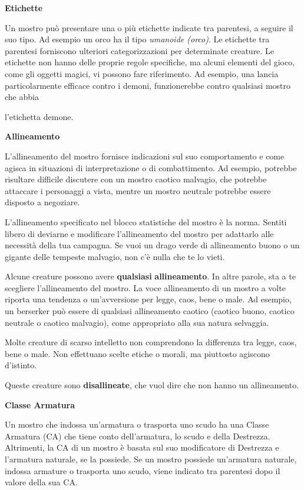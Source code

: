\begin{multicols}{2}
\textbf{Etichette}

Un mostro può presentare una o più etichette indicate tra parentesi, a
seguire il suo tipo. Ad esempio un orco ha il tipo \emph{umanoide
(orco)}. Le etichette tra parentesi forniscono ulteriori
categorizzazioni per determinate creature. Le etichette non hanno delle
proprie regole specifiche, ma alcuni elementi del gioco, come gli
oggetti magici, vi possono fare riferimento. Ad esempio, una lancia
particolarmente efficace contro i demoni, funzionerebbe contro qualsiasi
mostro che abbia

l'etichetta demone.

\textbf{Allineamento}

L'allineamento del mostro fornisce indicazioni sul suo comportamento e
come agisca in situazioni di interpretazione o di combattimento. Ad
esempio, potrebbe risultare difficile discutere con un mostro caotico
malvagio, che potrebbe attaccare i personaggi a vista, mentre un mostro
neutrale potrebbe essere disposto a negoziare.

L'allineamento specificato nel blocco statistiche del mostro è la norma.
Sentiti libero di deviarne e modificare l'allineamento del mostro per
adattarlo alle necessità della tua campagna. Se vuoi un drago verde di
allineamento buono o un gigante delle tempeste malvagio, non c'è nulla
che te lo vieti.

Alcune creature possono avere \textbf{qualsiasi} \textbf{allineamento}.
In altre parole, sta a te scegliere l'allineamento del mostro. La voce
allineamento di un mostro a volte riporta una tendenza o un'avversione
per legge, caos, bene o male. Ad esempio, un berserker può essere di
qualsiasi allineamento caotico (caotico buono, caotico neutrale o
caotico malvagio), come appropriato alla sua natura selvaggia.

Molte creature di scarso intelletto non comprendono la differenza tra
legge, caos, bene o male. Non effettuano scelte etiche o morali, ma
piuttosto agiscono d'istinto.

Queste creature sono \textbf{disallineate}, che vuol dire che non hanno
un allineamento.

\textbf{Classe Armatura}

Un mostro che indossa un'armatura o trasporta uno scudo ha una Classe
Armatura (CA) che tiene conto dell'armatura, lo scudo e della Destrezza.
Altrimenti, la CA di un mostro è basata sul suo modificatore di
Destrezza e l'armatura naturale, se la possiede. Se un mostro possiede
un'armatura naturale, indossa armature o trasporta uno scudo, viene
indicato tra parentesi dopo il valore della sua CA.


\end{multicols}
